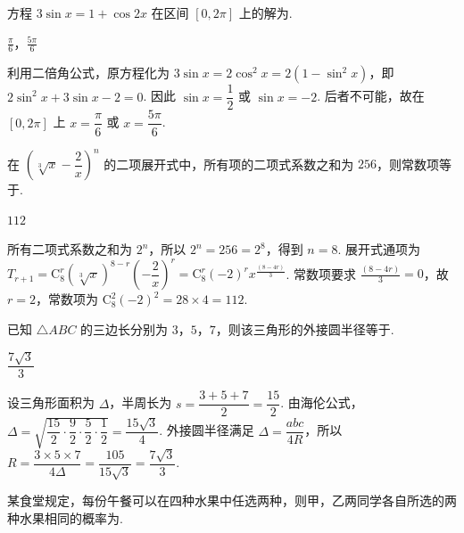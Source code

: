 \begin{problem}
方程 \(3\sin x=1+\cos2x\) 在区间 \([0,2\pi]\) 上的解为\fillinblank{}.
\end{problem}

\begin{answer}
\(\frac{\pi}{6}\)，\(\frac{5\pi}{6}\)
\end{answer}

\begin{solution}
利用二倍角公式，原方程化为 \(3\sin x=2\cos^2x=2(1-\sin^2x)\)，即 \(2\sin^2x+3\sin x-2=0\). 因此 \(\sin x=\dfrac12\) 或 \(\sin x=-2\). 后者不可能，故在 \([0,2\pi]\) 上 \(x=\dfrac\pi6\) 或 \(x=\dfrac{5\pi}6\).
\end{solution}

\begin{problem}
在 \(\left(\sqrt[3]{x}-\dfrac2x\right)^n\) 的二项展开式中，所有项的二项式系数之和为 \(256\)，则常数项等于\fillinblank{}.
\end{problem}

\begin{answer}
\(112\)
\end{answer}

\begin{solution}
所有二项式系数之和为 \(2^n\)，所以 \(2^n=256=2^8\)，得到 \(n=8\). 展开式通项为 \(T_{r+1}=\mathrm C_8^r\left(\sqrt[3]{x}\right)^{8-r}\left(-\dfrac2x\right)^r=\mathrm C_8^r(-2)^r x^{\frac{(8-4r)}{3}}\). 常数项要求 \(\frac{(8-4r)}{3}=0\)，故 \(r=2\)，常数项为 \(\mathrm C_8^2(-2)^2=28\times4=112\).
\end{solution}

\begin{problem}
已知 \(\triangle ABC\) 的三边长分别为 \(3\)，\(5\)，\(7\)，则该三角形的外接圆半径等于\fillinblank{}.
\end{problem}

\begin{answer}
\(\dfrac{7\sqrt{3}}{3}\)
\end{answer}

\begin{solution}
设三角形面积为 \(\Delta\)，半周长为 \(s=\dfrac{3+5+7}{2}=\dfrac{15}{2}\). 由海伦公式，\(\Delta=\sqrt{\dfrac{15}{2}\cdot\dfrac92\cdot\dfrac52\cdot\dfrac12}=\dfrac{15\sqrt3}{4}\). 外接圆半径满足 \(\Delta=\dfrac{abc}{4R}\)，所以 \(R=\dfrac{3\times5\times7}{4\Delta}=\dfrac{105}{15\sqrt3}=\dfrac{7\sqrt3}{3}\).
\end{solution}

\begin{problem}
某食堂规定，每份午餐可以在四种水果中任选两种，则甲，乙两同学各自所选的两种水果相同的概率为\fillinblank{}.
\end{problem}


